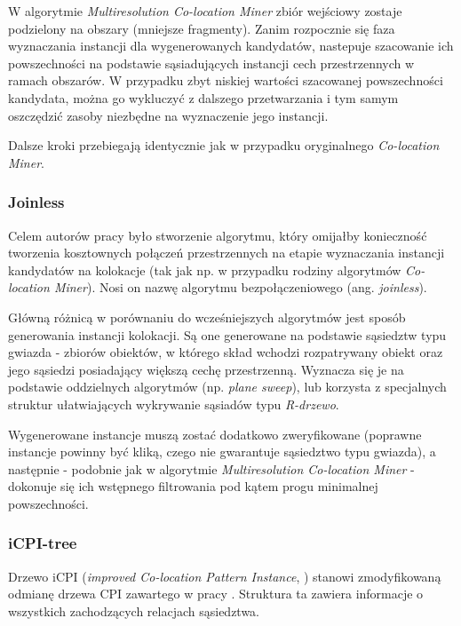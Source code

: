 \documentclass[12pt]{article}
\newcounter{algorytm}
\begin{document}
W algorytmie \textit{Multiresolution Co-location Miner} zbiór wejściowy zostaje podzielony na obszary (mniejsze fragmenty). Zanim rozpocznie się faza wyznaczania instancji dla wygenerowanych kandydatów, nastepuje szacowanie ich powszechności na podstawie sąsiadujących instancji cech przestrzennych w ramach obszarów. W przypadku zbyt niskiej wartości szacowanej powszechności kandydata, można go wykluczyć z dalszego przetwarzania i tym samym oszczędzić zasoby niezbędne na wyznaczenie jego instancji.

Dalsze kroki przebiegają identycznie jak w przypadku oryginalnego \textit{Co-location Miner}.

\subsubsection{Joinless}

Celem autorów pracy \cite{joinless} było stworzenie algorytmu, który omijałby konieczność tworzenia kosztownych połączeń przestrzennych na etapie wyznaczania instancji kandydatów na kolokacje (tak jak np. w przypadku rodziny algorytmów \textit{Co-location Miner}). Nosi on nazwę algorytmu bezpołączeniowego (ang. \textit{joinless}).

Główną różnicą w porównaniu do wcześniejszych algorytmów jest sposób generowania instancji kolokacji. Są one generowane na podstawie sąsiedztw typu gwiazda - zbiorów obiektów, w którego skład wchodzi rozpatrywany obiekt oraz jego sąsiedzi posiadający większą cechę przestrzenną. Wyznacza się je na podstawie oddzielnych algorytmów (np. \textit{plane sweep}), lub korzysta z specjalnych struktur ułatwiających wykrywanie sąsiadów typu \textit{R-drzewo}.

Wygenerowane instancje muszą zostać dodatkowo zweryfikowane (poprawne instancje powinny być kliką, czego nie gwarantuje sąsiedztwo typu gwiazda), a następnie - podobnie jak w algorytmie \textit{Multiresolution Co-location Miner} - dokonuje się ich wstępnego filtrowania pod kątem progu minimalnej powszechności.

\subsubsection{iCPI-tree}

Drzewo iCPI (\textit{improved Co-location Pattern Instance}, \cite{icpi}) stanowi zmodyfikowaną odmianę drzewa CPI zawartego w pracy \cite{cpi}. Struktura ta zawiera informacje o wszystkich zachodzących relacjach sąsiedztwa. 
\end{document}
